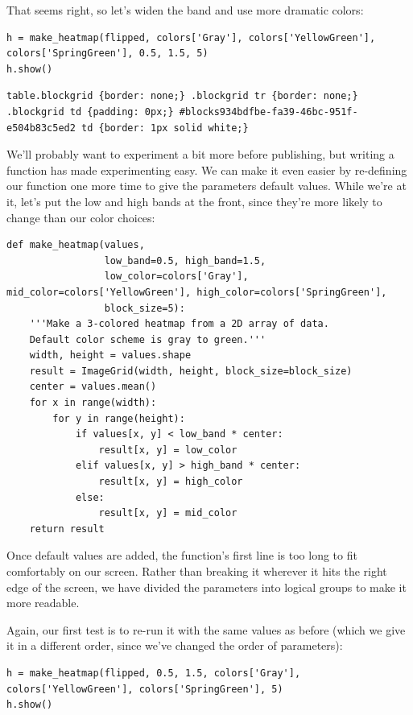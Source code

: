\documentclass{book}
\begin{document}
That seems right, so let's widen the band and use more dramatic colors:

\begin{verbatim}
h = make_heatmap(flipped, colors['Gray'], colors['YellowGreen'], colors['SpringGreen'], 0.5, 1.5, 5)
h.show()
\end{verbatim}

\begin{verbatim}
table.blockgrid {border: none;} .blockgrid tr {border: none;} .blockgrid td {padding: 0px;} #blocks934bdfbe-fa39-46bc-951f-e504b83c5ed2 td {border: 1px solid white;}
\end{verbatim}

We'll probably want to experiment a bit more before publishing, but
writing a function has made experimenting easy. We can make it even
easier by re-defining our function one more time to give the parameters
default values. While we're at it, let's put the low and high bands at
the front, since they're more likely to change than our color choices:

\begin{verbatim}
def make_heatmap(values,
                 low_band=0.5, high_band=1.5,
                 low_color=colors['Gray'], mid_color=colors['YellowGreen'], high_color=colors['SpringGreen'],
                 block_size=5):
    '''Make a 3-colored heatmap from a 2D array of data.
    Default color scheme is gray to green.'''
    width, height = values.shape
    result = ImageGrid(width, height, block_size=block_size)
    center = values.mean()
    for x in range(width):
        for y in range(height):
            if values[x, y] < low_band * center:
                result[x, y] = low_color
            elif values[x, y] > high_band * center:
                result[x, y] = high_color
            else:
                result[x, y] = mid_color
    return result
\end{verbatim}

Once default values are added, the function's first line is too long to
fit comfortably on our screen. Rather than breaking it wherever it hits
the right edge of the screen, we have divided the parameters into
logical groups to make it more readable.

Again, our first test is to re-run it with the same values as before
(which we give it in a different order, since we've changed the order of
parameters):

\begin{verbatim}
h = make_heatmap(flipped, 0.5, 1.5, colors['Gray'], colors['YellowGreen'], colors['SpringGreen'], 5)
h.show()
\end{verbatim}
\end{document}
